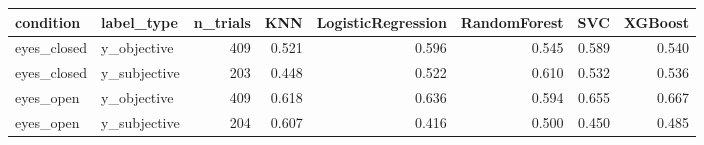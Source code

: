 \begin{tabular}{llrrrrrr}
\toprule
  condition &   label\_type &  n\_trials &   KNN &  LogisticRegression &  RandomForest &   SVC &  XGBoost \\
\midrule
eyes\_closed &  y\_objective &       409 & 0.521 &               0.596 &         0.545 & 0.589 &    0.540 \\
eyes\_closed & y\_subjective &       203 & 0.448 &               0.522 &         0.610 & 0.532 &    0.536 \\
  eyes\_open &  y\_objective &       409 & 0.618 &               0.636 &         0.594 & 0.655 &    0.667 \\
  eyes\_open & y\_subjective &       204 & 0.607 &               0.416 &         0.500 & 0.450 &    0.485 \\
\bottomrule
\end{tabular}
